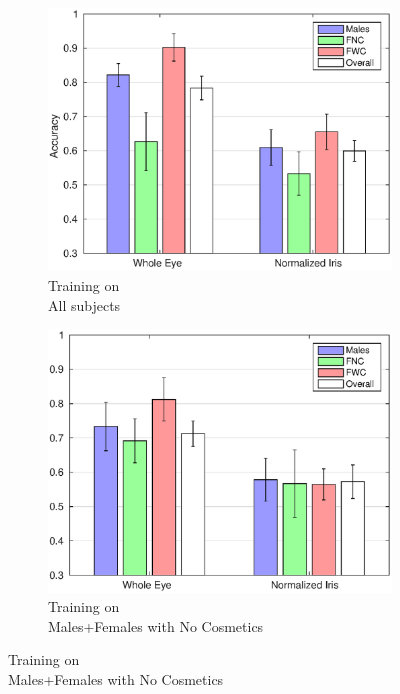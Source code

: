 \documentclass[10pt,twocolumn,letterpaper]{article}
\begin{document}
\begin{figure}[!htbp]
    \captionsetup[subfigure]{justification=centering}
    \centering
    \begin{subfigure}[b]{0.3\textwidth}
        \centering
        \includegraphics[width=\textwidth]{img/acc_all.eps}
        \caption{Training on \\All subjects}
        \label{fig:irisall}
    \end{subfigure}
    \hfill
    \begin{subfigure}[b]{0.3\textwidth}
        \centering
        \includegraphics[width=\textwidth]{img/acc_fnc.eps}
        \caption{Training on \\Males+Females with No Cosmetics}

\end{subfigure}
\end{figure}
\end{document}
